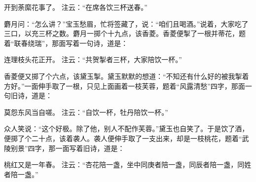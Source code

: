 \documentclass[12pt,oneside]{book}
\begin{document}
开到荼縻花事了。
注云：“在席各饮三杯送春。”

麝月问：“怎么讲？”宝玉愁眉，忙将签藏了，说：“咱们且喝酒。”说着，大家吃了三口，以充三杯之数。麝月一掷个十九点，该香菱。香菱便掣了一根并蒂花，题着“联春绕瑞”，那面写着一句诗，道是：

连理枝头花正开。
注云：“共贺掣者三杯，大家陪饮一杯。”

香菱便又掷了个六点，该黛玉掣。黛玉默默的想道：“不知还有什么好的被我掣着方好。”一面伸手取了一根，只见上面画着一枝芙蓉，题着“风露清愁”四字，那面一句旧诗，道是：

莫怨东风当自嗟。
注云：“自饮一杯，牡丹陪饮一杯。”

众人笑说：“这个好极。除了他，别人不配作芙蓉。”黛玉也自笑了。于是饮了酒，便掷了个二十点，该着袭人。袭人便伸手取了一支出来，却是一枝桃花，题着“武陵别景”四字，那一面写着旧诗，道是：

桃红又是一年春。
注云：“杏花陪一盏，坐中同庚者陪一盏，同辰者陪一盏，同姓者陪一盏。”
\end{document}
